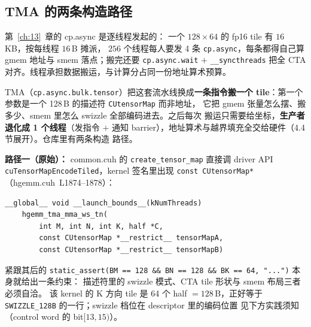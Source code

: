 \subsection{TMA 的两条构造路径}

第~\ref{ch:13}~章的 cp.async 是逐线程发起的：
一个 $128\times64$ 的 fp16 tile 有 $16$\,KB，按每线程 $16$\,B 摊派，
$256$ 个线程每人要发 4 条 \texttt{cp.async}，每条都得自己算 gmem 地址与
smem 落点；搬完还要 \texttt{cp.\allowbreak{}async.\allowbreak{}wait} $+$ \texttt{\_\allowbreak{}\_\allowbreak{}syncthreads}
把全 CTA 对齐。线程承担数据搬运，与计算分占同一份地址算术预算。

TMA（\texttt{cp.\allowbreak{}async.\allowbreak{}bulk.\allowbreak{}tensor}）把这套流水线换成\textbf{一条指令搬一个
tile}：第一个参数是一个 128\,B 的描述符 \texttt{CUtensorMap} 而非地址，
它把 gmem 张量怎么摆、搬多少、smem 里怎么 swizzle 全部编码进去。之后每次
搬运只需要给坐标，\textbf{生产者退化成 1 个线程}（发指令 $+$ 通知
barrier），地址算术与越界填充全交给硬件（4.4 节展开）。仓库里有两条构造
路径。

\textbf{路径一（原始）：} common.cuh 的 \texttt{create\_\allowbreak{}tensor\_\allowbreak{}map} 直接调
driver API \texttt{cu\allowbreak{}Tensor\allowbreak{}Map\allowbreak{}Encode\allowbreak{}Tiled}，kernel 签名里出现
\texttt{const CUtensor\allowbreak{}Map*}（hgemm.cuh~L1874--1878）：

\begin{lstlisting}
__global__ void __launch_bounds__(kNumThreads)
    hgemm_tma_mma_ws_tn(
        int M, int N, int K, half *C,
        const CUtensorMap *__restrict__ tensorMapA,
        const CUtensorMap *__restrict__ tensorMapB)
\end{lstlisting}

紧跟其后的 \texttt{static\_\allowbreak{}assert\allowbreak{}(BM =\allowbreak{}=\allowbreak{} 128 \&\& BN =\allowbreak{}=\allowbreak{} 128 \&\& BK =\allowbreak{}=\allowbreak{} 64,\allowbreak{}
"...")} 本身就给出一条约束：
描述符里的 swizzle 模式、CTA tile 形状与 smem 布局三者必须自洽。
该 kernel 的 K 方向 tile 是 64 个 half $=128$\,B，正好等于
\texttt{SWIZZLE\_\allowbreak{}128\allowbreak{}B} 的一行；swizzle 档位在 descriptor 里的编码位置
见下方实践须知（control word 的 bit$[13,15)$）。

